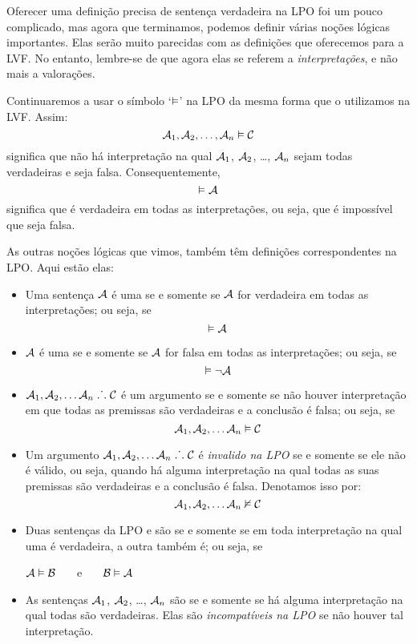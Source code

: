 Oferecer uma definição precisa de sentença verdadeira na LPO foi um pouco complicado, mas agora que terminamos, podemos definir várias noções lógicas importantes.
Elas serão muito parecidas com as definições que oferecemos para a LVF.
No entanto, lembre-se de que agora elas se referem a \emph{interpretações}, e não mais a valorações.

Continuaremos a usar o símbolo `$\vDash$' na LPO da mesma forma que o utilizamos na LVF.
Assim:
	$$\mathcal{A}_1, \mathcal{A}_2, \ldots, \mathcal{A}_n \vDash\mathcal{C}$$
significa que não há interpretação na qual $\mathcal{A}_1$, $\mathcal{A}_2$, \dots, $\mathcal{A}_n$ sejam todas verdadeiras e  seja falsa. Consequentemente,
	$$\vDash\mathcal{A}$$
significa que  é verdadeira em todas as interpretações, ou seja, que é impossível que  seja falsa.

As outras noções lógicas que vimos, também têm definições correspondentes na LPO.
Aqui estão elas:

\begin{itemize}
\item Uma sentença  $\mathcal{A}$ é uma  se e somente se $\mathcal{A}$ for verdadeira em todas as interpretações; ou seja, se
$$\vDash\mathcal{A}$$ \label{def:validade_logica}
\item $\mathcal{A}$ é uma  se e somente se $\mathcal{A}$ for falsa em todas as interpretações; ou seja, se
$$\vDash\neg\mathcal{A}$$
\item $\mathcal{A}_1, \mathcal{A}_2, \ldots \mathcal{A}_n \mathrel{\ldotp\dot{}\,\ldotp} \mathcal{C}$ é um argumento  se e somente se não houver interpretação em que todas as premissas são verdadeiras e a conclusão é falsa; ou seja, se
$$\mathcal{A}_1,\mathcal{A}_2,\ldots \mathcal{A}_n \vDash\mathcal{C}$$

\item Um argumento $\mathcal{A}_1, \mathcal{A}_2, \ldots \mathcal{A}_n \mathrel{\ldotp\dot{}\,\ldotp} \mathcal{C}$ é \textit{invalido na LPO} se e somente se ele não é válido, ou seja, quando há alguma interpretação na qual todas as suas premissas são verdadeiras e a conclusão é falsa.
Denotamos isso por:
$$\mathcal{A}_1,\mathcal{A}_2,\ldots \mathcal{A}_n \nvDash\mathcal{C}$$
 
\item Duas sentenças da LPO  e  são  se e somente se em toda interpretação na qual uma é verdadeira, a outra também é; ou seja, se
\begin{center}
	$\mathcal{A}\vDash\mathcal{B}$ \ \ \ e \ \ \ $\mathcal{B}\vDash\mathcal{A}$
\end{center}

\item As sentenças $\mathcal{A}_1$, $\mathcal{A}_2$, \dots, $\mathcal{A}_n$ são  se e somente se há alguma interpretação na qual todas são verdadeiras.
Elas são \textit{incompatíveis na LPO} se não houver tal interpretação.
\end{itemize}


